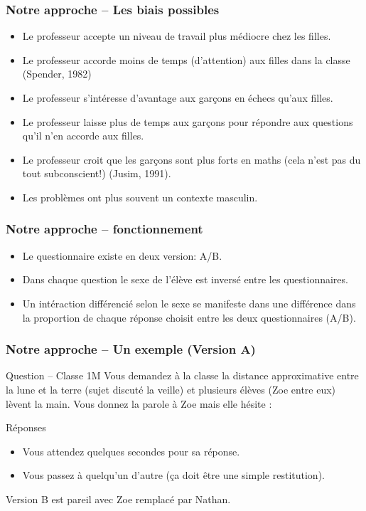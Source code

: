 \documentclass{beamer}
\begin{document}
\begin{frame}
\frametitle{Notre approche -- Les biais possibles}
\begin{itemize}
\item Le professeur accepte un niveau de travail plus médiocre chez les filles.
\item Le professeur accorde moins de temps (d’attention) aux filles dans
  la classe (Spender, 1982)
\item Le professeur s’intéresse d'avantage aux garçons en échecs qu’aux filles.
\item Le professeur laisse plus de temps aux garçons pour répondre aux
  questions qu’il n’en accorde aux filles.
\item Le professeur croit que les garçons sont plus forts en maths
  (cela n’est pas du tout subconscient!) (Jusim, 1991).
\item Les problèmes ont plus souvent un contexte masculin.
\end{itemize}
\end{frame}

\begin{frame}
\frametitle{Notre approche -- fonctionnement}
\begin{itemize}
\item Le questionnaire existe en deux version: A/B.
\item Dans chaque question le sexe de l'élève est inversé entre
  les questionnaires.
\item Un intéraction différencié selon le sexe se manifeste dans une différence
dans la proportion de chaque réponse choisit entre les deux questionnaires (A/B). 
  
\end{itemize}
\end{frame}


\begin{frame}
\frametitle{Notre approche -- Un exemple (Version A)}
\begin{block}{Question – Classe 1M}
  Vous demandez à la classe la distance approximative entre la lune et la terre
  (sujet discuté la veille) et plusieurs élèves (Zoe entre eux) lèvent la main.
  Vous donnez la parole à Zoe mais elle hésite :
\end{block}

\begin{block}{Réponses}
\begin{itemize}
\item Vous attendez quelques secondes pour sa réponse.
\item Vous passez à quelqu’un d’autre (ça doit être une simple restitution).
\end{itemize}
\end{block}

Version B est pareil avec Zoe remplacé par Nathan.
\end{frame}
\end{document}

